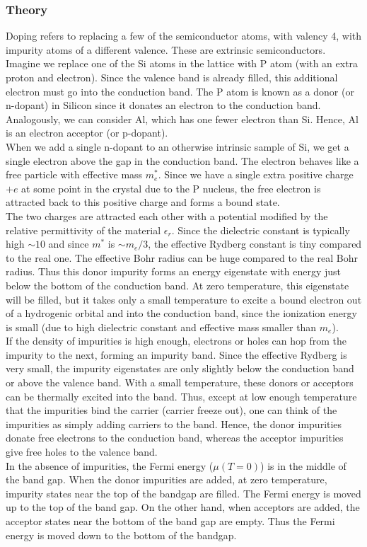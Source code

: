\documentclass[a4paper]{article}
\begin{document}
\subsubsection*{Theory}
\begin{Note}
Doping refers to replacing a few of the semiconductor atoms, with valency 4, with impurity atoms of a different valence. These are extrinsic semiconductors.\\[5pt]
Imagine we replace one of the Si atoms in the lattice with P atom (with an extra proton and electron). Since the valence band is already filled, this additional electron must go into the conduction band. The P atom is known as a donor (or n-dopant) in Silicon since it donates an electron to the conduction band. Analogously, we can consider Al, which has one fewer electron than Si. Hence, Al is an electron acceptor (or p-dopant).\\[5pt]
When we add a single n-dopant to an otherwise intrinsic sample of Si, we get a single electron above the gap in the conduction band. The electron behaves like a free particle with effective mass $m_e^*$. Since we have a single extra positive charge $+e$ at some point in the crystal due to the P nucleus, the free electron is attracted back to this positive charge and forms a bound state.\\[5pt]
The two charges are attracted each other with a potential modified by the relative permittivity of the material $\epsilon_r$. Since the dielectric constant is typically high $\sim10$ and since $m^*$ is $\sim m_e/3$, the effective Rydberg constant is tiny compared to the real one. The effective Bohr radius can be huge compared to the real Bohr radius. Thus this donor impurity forms an energy eigenstate with energy just below the bottom of the conduction band. At zero temperature, this eigenstate will be filled, but it takes only a small temperature to excite a bound electron out of a hydrogenic orbital and into the conduction band, since the ionization energy is small (due to high dielectric constant and effective mass smaller than $m_e$).\\[5pt]
If the density of impurities is high enough, electrons or holes can hop from the impurity to the next, forming an impurity band. Since the effective Rydberg is very small, the impurity eigenstates are only slightly below the conduction band or above the valence band. With a small temperature, these donors or acceptors can be thermally excited into the band. Thus, except at low enough temperature that the impurities bind the carrier (carrier freeze out), one can think of the impurities as simply adding carriers to the band. Hence, the donor impurities donate free electrons to the conduction band, whereas the acceptor impurities give free holes to the valence band.\\[5pt]
In the absence of impurities, the Fermi energy ($\mu(T=0)$) is in the middle of the band gap. When the donor impurities are added, at zero temperature, impurity states near the top of the bandgap are filled. The Fermi energy is moved up to the top of the band gap. On the other hand, when acceptors are added, the acceptor states near the bottom of the band gap are empty. Thus the Fermi energy is moved down to the bottom of the bandgap.
\end{Note}
\end{document}
